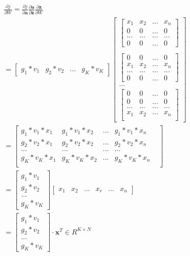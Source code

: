 \documentclass[UTF8]{article}
\begin{document}
\begin{equation}
\begin{aligned}
\frac{\partial{j}}{\partial{W}}=\frac{\partial{j}}{\partial{\boldsymbol{a}}} \frac{\partial{\boldsymbol{a}}}{\partial{\boldsymbol{z}}} \frac{\partial{\boldsymbol{z}}}{\partial{W}} \\
=\begin{bmatrix}
 g_{1}*v_{1} & g_{2}*v_{2} & ... & g_{K}*v_{K}
 \end{bmatrix} \begin{bmatrix}
 \begin{bmatrix}
 x_{1} & x_{2} & ... & x_{n} \\
 0 & 0 & ... &　0 \\
 ... & ... & ... & ... \\
 0 & 0 & ... & 0
 \end{bmatrix} \\ \\
 \begin{bmatrix}
 0 & 0 & ... & 0 \\
 x_{1} & x_{2} & ... & x_{n} \\
 ... & ... & ... & ... \\
 0 & 0 & ... & 0
 \end{bmatrix} \\
 ... \\
 \begin{bmatrix}
 0 & 0 & ... & 0 \\
 0 & 0 & ... & 0 \\
 ... & ... & ... & ... \\
 x_{1} & x_{2} & ... & x_{n} \\
 \end{bmatrix}
 \end{bmatrix} \\
 =\begin{bmatrix}
 g_{1}*v_{1}*x_{1} & g_{1}*v_{1}*x_{2} & ... & g_{1}*v_{1}*x_{n} \\
 g_{2}*v_{2}*x_{1} & g_{2}*v_{2}*x_{2} & ... & g_{2}*v_{2}*x_{n} \\
 ... & ... & ... & ... & \\
g_{K}*v_{K}*x_{1} & g_{K}*v_{K}*x_{2} & ... & g_{K}*v_{K}*x_{n} \\
 \end{bmatrix} \\
 =\begin{bmatrix}
 g_{1}*v_{1} \\
 g_{2}*v_{2} \\
 ... \\
g_{K}*v_{K}
\end{bmatrix} \begin{bmatrix}
 x_{1} & x_{2} & ... & x_{r} & ... & x_{n}
 \end{bmatrix} \\
 =\begin{bmatrix}
 g_{1}*v_{1} \\
 g_{2}*v_{2} \\
 ... \\
g_{K}*v_{K}
\end{bmatrix} \cdot \boldsymbol{x}^{T} \in R^{K \times N}
\end{aligned}
\label{mlp-leaky-relu-pj-pW-def}
\end{equation}
\end{document}
